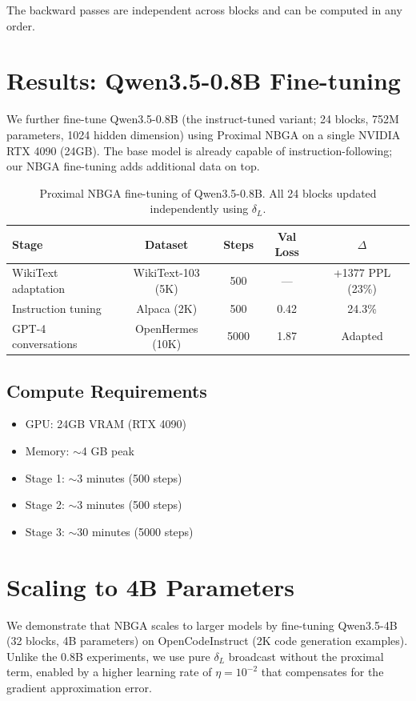 \documentclass[11pt]{article}
\begin{document}
The backward passes are independent across blocks and can be computed in any order.

\section{Results: Qwen3.5-0.8B Fine-tuning}

We further fine-tune Qwen3.5-0.8B (the instruct-tuned variant; 24 blocks, 752M parameters, 1024 hidden dimension) using Proximal NBGA on a single NVIDIA RTX 4090 (24GB). The base model is already capable of instruction-following; our NBGA fine-tuning adds additional data on top.

\begin{table}[h]
\centering
\begin{tabular}{lcccc}
\toprule
Stage & Dataset & Steps & Val Loss & $\Delta$ \\
\midrule
WikiText adaptation & WikiText-103 (5K) & 500 & --- & +1377 PPL (23\%) \\
Instruction tuning & Alpaca (2K) & 500 & 0.42 & 24.3\% \\
GPT-4 conversations & OpenHermes (10K) & 5000 & 1.87 & Adapted \\
\bottomrule
\end{tabular}
\caption{Proximal NBGA fine-tuning of Qwen3.5-0.8B. All 24 blocks updated independently using $\delta_L$.}
\end{table}

\subsection{Compute Requirements}

\begin{itemize}
\item GPU: 24GB VRAM (RTX 4090)
\item Memory: $\sim$4 GB peak
\item Stage 1: $\sim$3 minutes (500 steps)
\item Stage 2: $\sim$3 minutes (500 steps)
\item Stage 3: $\sim$30 minutes (5000 steps)
\end{itemize}

\section{Scaling to 4B Parameters}

We demonstrate that NBGA scales to larger models by fine-tuning Qwen3.5-4B (32 blocks, 4B parameters) on OpenCodeInstruct (2K code generation examples). Unlike the 0.8B experiments, we use pure $\delta_L$ broadcast without the proximal term, enabled by a higher learning rate of $\eta = 10^{-2}$ that compensates for the gradient approximation error.
\end{document}
